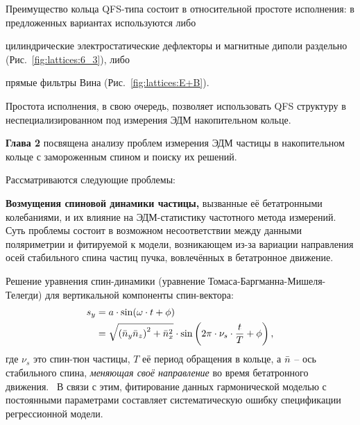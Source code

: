 Преимущество кольца QFS-типа состоит в относительной простоте исполнения: 
в предложенных вариантах используются либо
\begin{enumerate*}
	\item цилиндрические электростатические дефлекторы и магнитные диполи раздельно
	(Рис.~\ref{fig:lattices:6_3}), либо
	\item прямые фильтры Вина (Рис.~\ref{fig:lattices:E+B}).	
\end{enumerate*}
Простота исполнения, в свою очередь, позволяет использовать QFS структуру в неспециализированном под
измерения ЭДМ накопительном кольце.

\textbf{Глава 2} посвящена анализу проблем измерения ЭДМ частицы 
в накопительном кольце с замороженным спином и поиску их решений. 

Рассматриваются следующие проблемы:

\textbf{Возмущения спиновой динамики частицы,} вызванные её бетатронными колебаниями, и их влияние на ЭДМ-статистику частотного метода измерений.
%
Суть проблемы состоит в возможном несоответствии между данными поляриметрии и фитируемой к модели, 
возникающем из-за вариации направления осей стабильного спина частиц пучка, 
вовлечённых в бетатронное движение.

Решение уравнения спин-динамики (уравнение Томаса-Баргманна-Мишеля-Телегди)
для вертикальной компоненты спин-вектора:
\begin{align}
s_y &= a\cdot \sin(\omega\cdot t + \phi)\notag\\
&= \sqrt{\bkt{\bar n_y\bar n_z}^2 + \bar n_x^2} \cdot \sin\bkt{2\pi\cdot\nu_s\cdot \frac{t}{T} + \phi},
\end{align}
где $\nu_s$ это спин-тюн частицы, $T$ её период обращения в кольце, а $\bar n$ -- ось стабильного спина, \emph{меняющая своё направление} во время бетатронного движения.~\cite[стр.~11]{Shatunov} В связи с этим, фитирование данных гармонической моделью с постоянными
параметрами составляет систематическую ошибку спецификации регрессионной модели.

